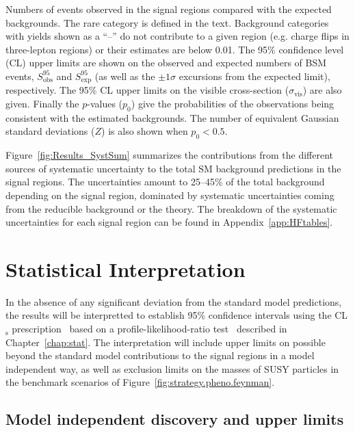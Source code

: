 \begin{table}
\begin{center}
\vspace*{1cm}

\vspace*{-0.01\textheight}\caption{Numbers of events observed in the signal regions compared with the expected backgrounds. 
The rare category is defined in the text. Background categories with yields shown as a ``--'' 
do not contribute to a given region (e.g. charge flips in three-lepton regions) or their estimates are below 0.01. 
The 95\% confidence level (CL) upper limits are shown on the observed and expected numbers of BSM events, $S_{\textrm{obs}}^{95}$ and $S_{\textrm{exp}}^{95}$ 
(as well as the $\pm 1\sigma$ excursions from the expected limit), respectively. The 95\% CL upper limits on the visible cross-section 
($\sigma_{\textrm{vis}}$) are also given. Finally the $p$-values ($p_{0}$) give the probabilities of the observations being consistent 
with the estimated backgrounds. The number of equivalent Gaussian standard deviations ($Z$) is also shown when $p_{0}<0.5$.}
\label{tab:SR_yields}
\end{center}
\end{table}

Figure~\ref{fig:Results_SystSum} summarizes the contributions from the different sources of systematic uncertainty 
to the total SM background predictions in the signal regions. The uncertainties amount to 25--45\% of the 
total background depending on the signal region, dominated by systematic uncertainties coming from the reducible background or the theory. 
The breakdown of the systematic uncertainties for each signal region can be found in Appendix~\ref{app:HFtables}.

\section{Statistical Interpretation}

In the absence of any significant deviation from the standard model predictions,
the results will be interpretted to 
 establish 95\% confidence intervals using the CL$_\mathrm{s}$ prescription~\cite{Read:2002hq} 
based on a profile-likelihood-ratio test~\cite{Cowan:2010js}
 described in Chapter~\ref{chap:stat}.
The interpretation will include upper limits on possible beyond the standard model contributions to the signal 
regions in a model independent way,
as well as exclusion limits on the masses of 
SUSY particles in the benchmark scenarios of Figure~\ref{fig:strategy.pheno.feynman}. 

\subsection{Model independent discovery and upper limits}

